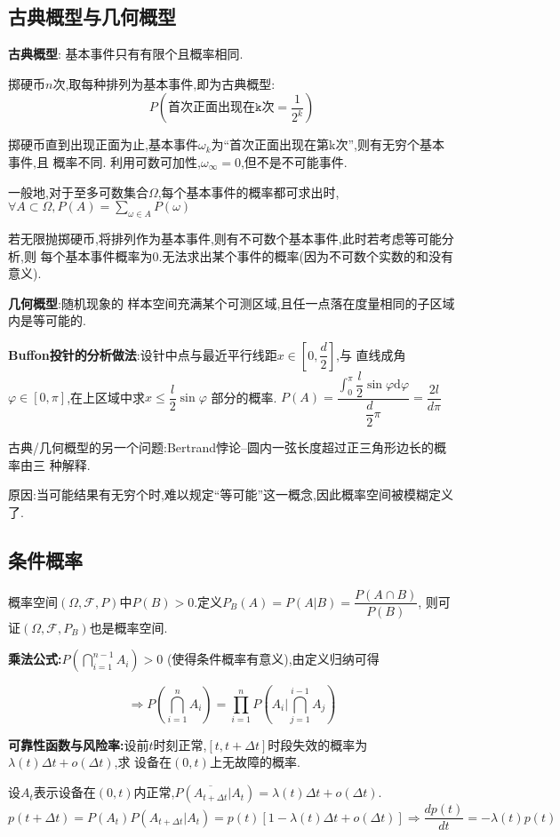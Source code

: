 \subsection{古典概型与几何概型}

{\bf 古典概型}: 基本事件只有有限个且概率相同.

掷硬币$ n$次,取每种排列为基本事件,即为古典概型:
\[  P(\texttt{首次正面出现在k次}=\dfrac{1}{2^k})\]

掷硬币直到出现正面为止,基本事件$ \omega_k$为``首次正面出现在第k次'',则有无穷个基本事件,且
概率不同. 
利用可数可加性,$ \omega_{\infty} = 0$,但不是不可能事件.

一般地,对于至多可数集合$ \Omega$,每个基本事件的概率都可求出时,$ \forall A
\subset \Omega, P(A) = \sum_{\omega \in A}P(\omega)$

若无限抛掷硬币,将排列作为基本事件,则有不可数个基本事件,此时若考虑等可能分析,则
每个基本事件概率为0.无法求出某个事件的概率(因为不可数个实数的和没有意义).

{\bf 几何概型}:随机现象的 样本空间充满某个可测区域,且任一点落在度量相同的子区域
内是等可能的.

{\bf Buffon投针的分析做法}:设针中点与最近平行线距$ x\in [0, \dfrac{d}{2}]$,与
直线成角$ \varphi\in[0,\pi]$,在上区域中求$ x \le \dfrac{l}{2}\sin{\varphi}$
部分的概率. $ P(A) =
\dfrac{\int_{0}^{\pi}{\dfrac{l}{2}\sin{\varphi}\mathrm{d}{\varphi}}}{\dfrac{d}{2}\pi}
= \dfrac{2l}{d\pi}$

古典/几何概型的另一个问题:Bertrand悖论--圆内一弦长度超过正三角形边长的概率由三
种解释.

原因:当可能结果有无穷个时,难以规定``等可能''这一概念,因此概率空间被模糊定义了.

\subsection{条件概率}
概率空间$( \Omega, \mathcal{F}, P)$中$ P(B) > 0$.定义$ P_B(A) = P(A | B) = \dfrac{P(A\cap B)}{P(B)}$,
则可证$ (\Omega, \mathcal{F}, P_B)$也是概率空间.

{\bf 乘法公式:}$ P(\bigcap_{i=1}^{n-1}A_i)>0$ (使得条件概率有意义),由定义归纳可得

\[ \Rightarrow P(\bigcap_{i=1}^nA_i) = \prod_{i=1}^n{P(A_i | \bigcap_{j=1}^{i-1}A_j)}\]

{\bf 可靠性函数与风险率:}设前$ t$时刻正常,$[t, t+\Delta t]$时段失效的概率为$ \lambda(t)\Delta t + o(\Delta t)$,求
设备在$ (0,t)$上无故障的概率.

设$ A_t$表示设备在$ (0,t)$内正常,$ P(\overline{A_{t+\Delta t}} | A_t) = \lambda(t)\Delta t + o(\Delta t)$.
\[ p(t + \Delta t) = P(A_t)P(A_{t+\Delta t}|A_t) = p(t)[1 - \lambda(t)\Delta t + o(\Delta t)]\Rightarrow \dfrac{dp(t)}{dt}=-\lambda(t)p(t)\]

